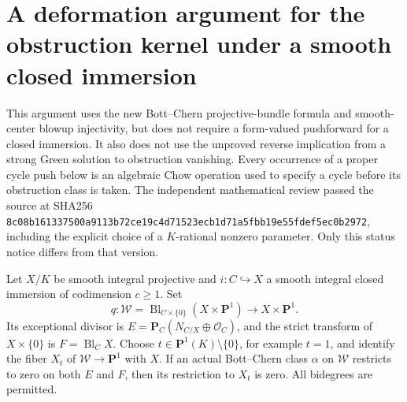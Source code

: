 \section{A deformation argument for the obstruction kernel under a smooth closed immersion}
\label{r16gi:section}

This argument uses the new Bott--Chern projective-bundle formula and
smooth-center blowup injectivity, but does not require a form-valued
pushforward for a closed immersion.  It also does not use the unproved
reverse implication from a strong Green solution to obstruction
vanishing.  Every occurrence of a proper cycle push below is an
algebraic Chow operation used to specify a cycle before its obstruction
class is taken.
The independent mathematical review passed the source at SHA256
\texttt{8c08b161337500a9113b72ce19c4d71523ecb1d71a5fbb19e55fdef5ec0b2972},
including the explicit choice of a $K$-rational nonzero parameter.
Only this status notice differs from that version.

\begin{lemma}
\label{r16gi:detection}
Let $X/K$ be smooth integral projective and
$i:C\hookrightarrow X$ a smooth integral closed immersion of
codimension $c\geq1$.  Set
\[
 q:\mathcal W=\operatorname{Bl}_{C\times\{0\}}
                    (X\times\mathbf P^1)\longrightarrow X\times\mathbf P^1.
\]
Its exceptional divisor is
$E=\mathbf P_C(N_{C/X}\oplus\mathcal O_C)$, and the strict transform
of $X\times\{0\}$ is $F=\operatorname{Bl}_C X$.  Choose
$t\in\mathbf P^1(K)\setminus\{0\}$, for example $t=1$, and
identify the fiber $X_t$ of $\mathcal W\to\mathbf P^1$ with $X$.
If an actual Bott--Chern class $\alpha$ on $\mathcal W$ restricts
to zero on both $E$ and $F$, then its restriction to $X_t$ is zero.
All bidegrees are permitted.
\end{lemma}

